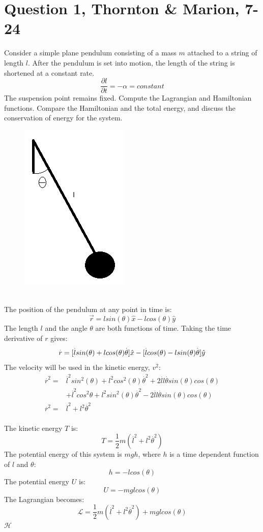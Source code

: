 \documentclass[a4paper,12pt]{article}
\newcommand{\V}[1]{\ensuremath{\vec{#1}}}
\newcommand{\F}[2]{\ensuremath{\frac{#1}{#2}}}
\newcommand{\vel}[1]{\overset{.}{#1}}
\begin{document}
\section*{Question 1, Thornton \& Marion, 7-24}

Consider a simple plane pendulum consisting of a mass $m$ attached to a string of length $l$. After the pendulum is set into motion, the length of the string is shortened at a constant rate. \[\F{\partial{l}}{\partial{t}}=-\alpha=constant\] The suspension point remains fixed. Compute the Lagrangian and Hamiltonian functions. Compare the Hamiltonian and the total energy, and discuss the conservation of energy for the system.
\\
\begin{figure}
\centering
\includegraphics{pendulum.png}
\end{figure}\\
The position of the pendulum at any point in time is:
\[\V{r}=lsin(\theta)\hat{x}-lcos(\theta)\hat{y}\]
The length $l$ and the angle $\theta$ are both functions of time. Taking the time derivative of $r$ gives:
\[\vel{r}=[\vel{l}sin(\theta)+lcos(\theta)\vel{\theta}]\hat{x}-[\vel{l}cos(\theta)-lsin(\theta)\vel{\theta}]\hat{y}\\\]
The velocity will be used in the kinetic energy, $v^2$:
\begin{align*}
\vel{r}^2=&\vel{l}^2sin^2(\theta)+l^2cos^2(\theta)\vel{\theta}^2+2\vel{l}l\vel{\theta}sin(\theta)cos(\theta)\\
&+\vel{l}^2cos^2{\theta}+l^2sin^2(\theta)\vel{\theta}^2-2\vel{l}l\vel{\theta}sin(\theta)cos(\theta)\\
\vel{r}^2=&\vel{l}^2+l^2\vel{\theta}^2
\end{align*}\\
The kinetic energy $T$ is:
\[T=\F{1}{2}m(\vel{l}^2+l^2\vel{\theta}^2)\]
The potential energy of this system is $mgh$, where $h$ is a time dependent function of $l$ and $\theta$:
\[h=-lcos(\theta)\]
The potential energy $U$ is:
\[U=-mglcos(\theta)\]
The Lagrangian becomes:
\[\mathcal{L}=\F{1}{2}m(\vel{l}^2+l^2\vel{\theta}^2)+mglcos(\theta)\]
$\mathcal{H}$
\end{document}
